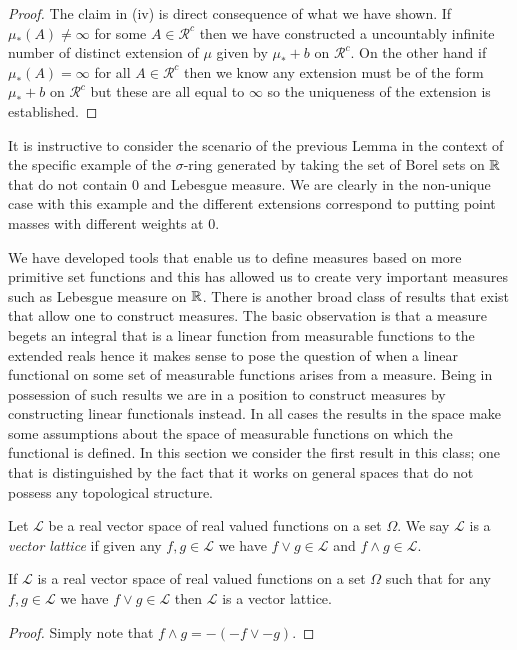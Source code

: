 \begin{proof}
The claim in (iv) is direct consequence of what we have shown.  If
$\mu_*(A) \neq \infty$ for some $A \in \mathcal{R}^c$ then we have
constructed a uncountably infinite number of distinct extension of
$\mu$ given by $\mu_* + b$ on $\mathcal{R}^c$.  On the other hand if
$\mu_*(A) = \infty$ for all $A \in \mathcal{R}^c$ then we know any
extension must be of the form $\mu_* + b$ on $\mathcal{R}^c$ but these
are all equal to $\infty$ so the uniqueness of the extension is established.
\end{proof}

\begin{examp}It is instructive to consider the scenario of the
  previous Lemma in the context of the specific example of the
  $\sigma$-ring generated by taking the set of Borel sets on $\mathbb{R}$
  that do not contain $0$ and Lebesgue measure.  We are clearly in the
  non-unique case with this example and the different extensions
  correspond to putting point masses with different weights at $0$.
\end{examp}
We have developed tools that enable us to define measures based on
more primitive set functions and this has allowed us to create very
important measures such as Lebesgue measure on $\mathbb{R}$.  There is
another broad class of results that exist that allow one to construct
measures.  The basic observation is that a measure begets an integral
that is a linear function from measurable functions to the extended
reals hence it makes sense to pose the question of when a linear
functional on some set of measurable functions arises from a measure.
Being in possession of such results we are in a position to construct
measures by constructing linear functionals instead.  In all cases the
results in the space make some assumptions about the space of
measurable functions on which the functional is defined.  In this
section we consider the first result in this class; one that is
distinguished by the fact that it works on general spaces that do not
possess any topological structure.

\begin{defn}Let $\mathcal{L}$ be a real vector space of real valued
  functions on a set $\Omega$.  We say $\mathcal{L}$ is a \emph{vector
    lattice} if given any $f,g \in \mathcal{L}$ we have $f \vee g \in
  \mathcal{L}$ and $f \wedge g \in \mathcal{L}$.
\end{defn}

\begin{prop}If $\mathcal{L}$ is a real vector space of real valued
  functions on a set $\Omega$ such that for any $f,g \in \mathcal{L}$
  we have $f \vee g \in \mathcal{L}$ then $\mathcal{L}$ is a vector lattice.
\end{prop}
\begin{proof}
Simply note that $f \wedge g = -(-f \vee -g)$.  
\end{proof}

